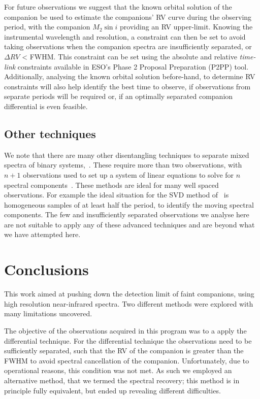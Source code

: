For future observations we suggest that the known orbital solution of the companion be used to estimate the companions' {RV} curve during the observing period, with the companion \(M_2\sin{i}\) providing an {RV} upper-limit.
Knowing the instrumental wavelength and resolution, a constraint can then be set to avoid taking observations when the companion spectra are insufficiently separated, or \(\Delta RV\) < {FWHM}.
This constraint can be set using the absolute and relative \emph{time-link} constraints available in {ESO}'s Phase 2 Proposal Preparation (P2PP) tool.
Additionally, analysing the known orbital solution before-hand, to determine {RV} constraints will also help identify the best time to observe, if observations from separate periods will be required or, if an optimally separated companion differential is even feasible.

\subsection{Other techniques}
We note that there are many other disentangling techniques to separate mixed spectra of binary systems,~\citep[e.g.][]{hadrava_disentangling_2009}.
These require more than two observations, with  \(n+1\) observations used to set up a system of linear equations to solve for \(n\) spectral components~\citep[e.g.][]{simon_disentangling_1994,czekala_disentangling_2017, sablowski_spectral_2016}.
These methods are ideal for many well spaced observations.
For example the ideal situation for the {SVD} method of~\citet{sablowski_spectral_2016} is homogeneous samples of at least half the period, to identify the moving spectral components.
The few and insufficiently separated observations we analyse here are not suitable to apply any of these advanced techniques and are beyond what we have attempted here.


\section{Conclusions}
\label{sec:conclusions}
This work aimed at pushing down the detection limit of faint companions, using high resolution near-infrared spectra.
Two different methods were explored with many limitations uncovered.

The objective of the observations acquired in this program was to a apply the differential technique.
For the differential technique the observations need to be sufficiently separated, such that the {RV} of the companion is greater than the {FWHM} to avoid spectral cancellation of the companion.
Unfortunately, due to operational reasons, this condition was not met.
As such we employed an alternative method, that we termed the spectral recovery; this method is in principle fully equivalent, but ended up revealing different difficulties.

